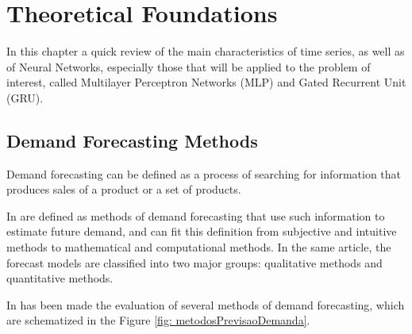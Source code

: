 \chapter{Theoretical Foundations } \label{cap:teoria}
  
In this chapter a quick review of the main characteristics of time series, as well as of Neural Networks, especially those that will be applied to the problem of interest, called Multilayer Perceptron Networks (MLP) and Gated Recurrent Unit (GRU).  

    \section{Demand Forecasting Methods} 
    
Demand forecasting can be defined as a process of searching for information that produces sales of a product or a set of products.

        In  are defined as methods of demand forecasting that use such information to estimate future demand, and can fit this definition from subjective and intuitive methods to mathematical and computational methods. In the same article, the forecast models are classified into two major groups: qualitative methods and quantitative methods.
        
         In   has been made the evaluation of several methods of demand forecasting, which are schematized in the Figure  \ref{fig: metodosPrevisaoDemanda}. 
        
                  \begin{figure}[ht]
                  \end{figure}
        
